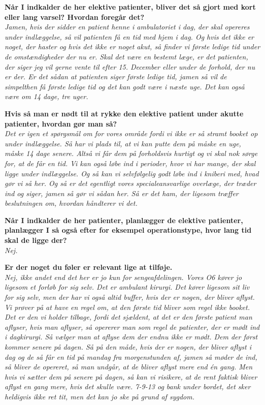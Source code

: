 \textbf{Når I indkalder de her elektive patienter, bliver det så gjort med kort eller lang varsel? Hvordan foregår det?}\\
\noindent
\textit{Jamen, hvis der sidder en patient henne i ambulatoriet i dag, der skal opereres under indlæggelse, så vil patienten få en tid med hjem i dag. Og hvis det ikke er noget, der haster og hvis det ikke er noget akut, så finder vi første ledige tid under de omstændigheder der nu er. Skal det være en bestemt læge, er det patienten, der siger jeg vil gerne vente til efter 15. December eller under de forhold, der nu er der. Er det sådan at patienten siger første ledige tid, jamen så vil de simpelthen få første ledige tid og det kan godt være i næste uge. Det kan også være om 14 dage, tre uger.}


\textbf{Hvis så man er nødt til at rykke den elektive patient under akutte patienter, hvordan gør man så?}\\
\noindent
\textit{Det er igen et spørgsmål om for vores område fordi vi ikke er så stramt booket op under indlæggelse. Så har vi plads til, at vi kan putte dem på måske en uge, måske 14 dage senere. Altså vi får dem på forholdsvis hurtigt og vi skal nok sørge for, at de får en tid. Vi kan også løbe ind i perioder, hvor vi har mange, der skal ligge under indlæggelse. Og så kan vi selvfølgelig godt løbe ind i kniberi med, hvad gør vi så her. Og så er det egentligt vores specialeansvarlige overlæge, der træder ind og siger, jamen så gør vi sådan her. Så er det ham, der ligesom træffer beslutningen om, hvordan håndterer vi det.} 


\textbf{Når I indkalder de her patienter, planlægger de elektive patienter, planlægger I så også efter for eksempel operationstype, hvor lang tid skal de ligge der?}\\
\noindent
\textit{Nej.}


\textbf{Er der noget du føler er relevant lige at tilføje.}
\\
\noindent
\textit{Nej, ikke andet end det her er jo kun for sengeafdelingen. Vores O6 kører jo ligesom et forløb for sig selv. Det er ambulant kirurgi. Det kører ligesom sit liv for sig selv, men der har vi også altid buffer, hvis der er nogen, der bliver aflyst. Vi prøver på at have en regel om, at den første tid bliver som regel ikke booket. Det er den vi holder tilbage, fordi det sjældent, at det er den første patient man aflyser, hvis man aflyser, så opererer man som regel de patienter, der er mødt ind i dagkirurgi. Så vælger man at aflyse dem der endnu ikke er mødt. Dem der først kommer senere på dagen. Så på den måde, hvis der er nogen, der bliver aflyst i dag og de så får en tid på mandag fra morgenstunden af, jamen så møder de ind, så bliver de opereret, så man undgår, at de bliver aflyst mere end én gang. Men hvis vi sætter dem på senere på dagen, så kan vi risikere, at de rent faktisk bliver aflyst en gang mere, hvis det skulle være. 7-9-13 og bank under bordet, det sker heldigvis ikke ret tit, men det kan jo ske på grund af sygdom.}


